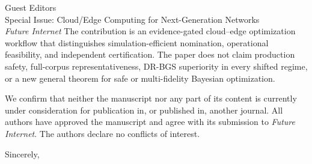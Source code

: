 \documentclass[10pt]{letter}
\begin{document}
\begin{letter}{Guest Editors\\Special Issue: Cloud/Edge Computing for Next-Generation Networks\\\emph{Future Internet}}
The contribution is an evidence-gated cloud--edge optimization workflow that distinguishes simulation-efficient nomination, operational feasibility, and independent certification. The paper does not claim production safety, full-corpus representativeness, DR-BGS superiority in every shifted regime, or a new general theorem for safe or multi-fidelity Bayesian optimization.

We confirm that neither the manuscript nor any part of its content is currently under consideration for publication in, or published in, another journal. All authors have approved the manuscript and agree with its submission to \emph{Future Internet}. The authors declare no conflicts of interest.

\closing{Sincerely,}
\end{letter}
\end{document}
